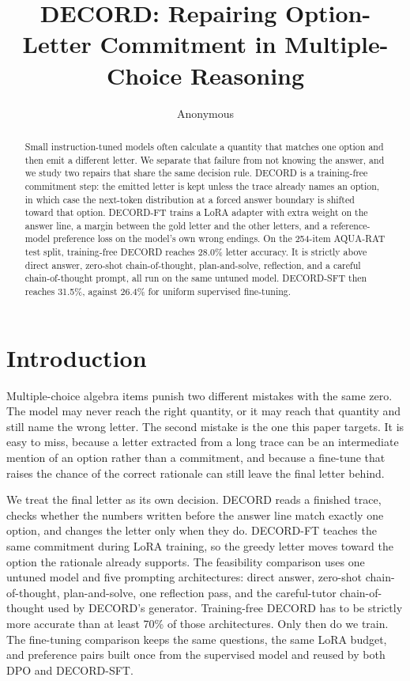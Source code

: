 \documentclass[11pt]{article}
\title{DECORD: Repairing Option-Letter Commitment in Multiple-Choice Reasoning}
\author{Anonymous}
\begin{document}
\maketitle

\begin{abstract}
Small instruction-tuned models often calculate a quantity that matches one option and then emit a different letter.
We separate that failure from not knowing the answer, and we study two repairs that share the same decision rule.
DECORD is a training-free commitment step: the emitted letter is kept unless the trace already names an option, in which case the next-token distribution at a forced answer boundary is shifted toward that option.
DECORD-FT trains a LoRA adapter with extra weight on the answer line, a margin between the gold letter and the other letters, and a reference-model preference loss on the model's own wrong endings.
On the 254-item AQUA-RAT test split, training-free DECORD reaches 28.0\% letter accuracy.
It is strictly above direct answer, zero-shot chain-of-thought, plan-and-solve, reflection, and a careful chain-of-thought prompt, all run on the same untuned model.
DECORD-SFT then reaches 31.5\%, against 26.4\% for uniform supervised fine-tuning.
\end{abstract}

\section{Introduction}

Multiple-choice algebra items punish two different mistakes with the same zero.
The model may never reach the right quantity, or it may reach that quantity and still name the wrong letter.
The second mistake is the one this paper targets.
It is easy to miss, because a letter extracted from a long trace can be an intermediate mention of an option rather than a commitment, and because a fine-tune that raises the chance of the correct rationale can still leave the final letter behind.

We treat the final letter as its own decision.
DECORD reads a finished trace, checks whether the numbers written before the answer line match exactly one option, and changes the letter only when they do.
DECORD-FT teaches the same commitment during LoRA training, so the greedy letter moves toward the option the rationale already supports.
The feasibility comparison uses one untuned model and five prompting architectures: direct answer, zero-shot chain-of-thought, plan-and-solve, one reflection pass, and the careful-tutor chain-of-thought used by DECORD's generator.
Training-free DECORD has to be strictly more accurate than at least 70\% of those architectures.
Only then do we train.
The fine-tuning comparison keeps the same questions, the same LoRA budget, and preference pairs built once from the supervised model and reused by both DPO and DECORD-SFT.
\end{document}
